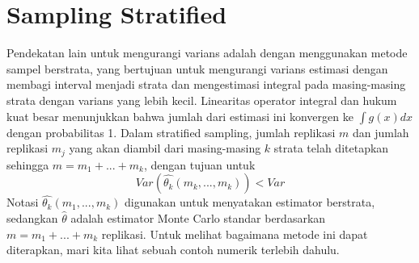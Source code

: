 \documentclass[a4paper,12pt]{article}
\theoremstyle{definition}
\begin{document}
\section{Sampling Stratified}
Pendekatan lain untuk mengurangi varians adalah dengan menggunakan metode sampel berstrata, yang bertujuan untuk mengurangi varians estimasi dengan membagi interval menjadi strata dan mengestimasi integral pada masing-masing strata dengan varians yang lebih kecil. Linearitas operator integral dan hukum kuat besar menunjukkan bahwa jumlah dari estimasi ini konvergen ke $\int g(x)dx$ dengan probabilitas 1. Dalam stratified sampling, jumlah replikasi $m$ dan jumlah replikasi $m_{j}$ yang akan diambil dari masing-masing $k$ strata telah ditetapkan sehingga $m = m_{1}+...+m_{k}$, dengan tujuan untuk
\begin{equation*}
    Var\left ( \widehat{\theta_{k}}(m_{k},...,m_{k}) \right )<Var
\end{equation*}
Notasi $\widehat{\theta_{k}}(m_{1}, . . . , m_{k})$ digunakan untuk menyatakan estimator berstrata, sedangkan $\widehat{\theta}$ adalah estimator Monte Carlo standar berdasarkan $m = m_{1}+...+m_{k}$ replikasi.
Untuk melihat bagaimana metode ini dapat diterapkan, mari kita lihat sebuah contoh numerik terlebih dahulu.
\end{document}
